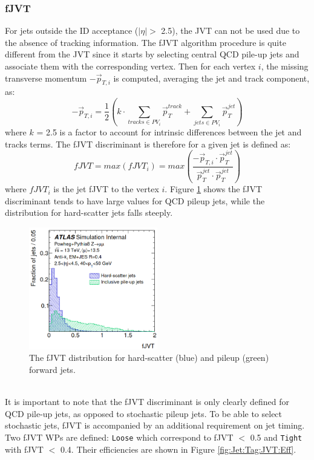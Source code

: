\subsubsection{fJVT}
\label{Jet:Tag:JVT:fJVT}
For jets outside the ID acceptance ($|\eta|>$ 2.5), the JVT can not be used due to the absence of tracking information. The fJVT algorithm procedure is quite different from the JVT since it starts by selecting central QCD pile-up jets and associate them with the corresponding vertex. Then for each vertex $i$, the missing transverse momentum $-\vec{p}_{T, i}$ is computed, averaging the jet and track component, as:
\begin{equation}
    -\vec{p}_{T, i}=\frac{1}{2}\left(k \cdot \sum_{tracks \in P V_{i}} \vec{p}_{T}^{track }+\sum_{jets \in PV_{i}} \vec{p}_{T}^{jet}\right)
\end{equation}
where $k$ = 2.5 is a factor to account for intrinsic differences between the jet and tracks terms. The fJVT discriminant is therefore for a given jet is defined as:
\begin{equation}
    fJVT = max(fJVT_i) = max(\frac{-\vec{p}_{T, i} \cdot \vec{p}_{T}^{j e t}}{\vec{p}_{T}^{j e t} \cdot \vec{p}_{T}^{j e t}})
\end{equation}
where $fJVT_i$ is the jet fJVT to the vertex $i$. Figure \ref{fig:Jet:Tag:JVT:fJVT} shows the fJVT discriminant tends to have large values for QCD pileup jets, while the distribution for hard-scatter jets falls steeply.
\begin{figure}[htbp]
    \centering
    \includegraphics[width=0.5\textwidth]{Ch4/Img/fJVT.png}
    \caption{The fJVT distribution for hard-scatter (blue) and pileup (green) forward jets.}
    \label{fig:Jet:Tag:JVT:fJVT}
\end{figure}
\\
It is important to note that the fJVT discriminant is only clearly defined for QCD pile-up jets, as opposed to stochastic pileup jets. To be able to select stochastic jets, fJVT is accompanied by an additional requirement on jet timing. Two fJVT WPs are defined: \texttt{Loose} which correspond to fJVT $<$ 0.5 and \texttt{Tight} with fJVT $<$ 0.4. Their efficiencies are shown in Figure \ref{fig:Jet:Tag:JVT:Eff}.
